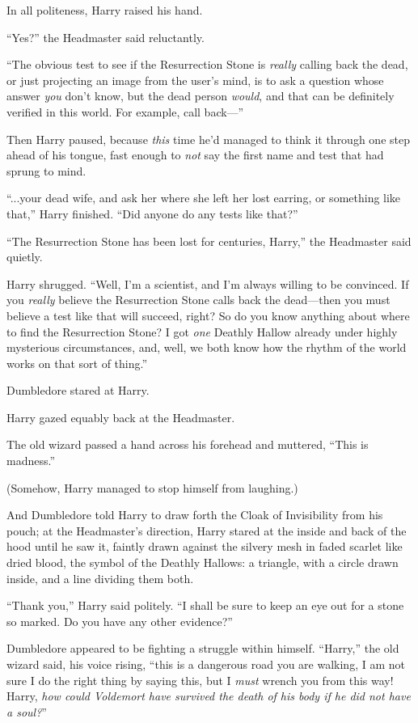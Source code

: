 In all politeness, Harry raised his hand.

“Yes?” the Headmaster said reluctantly.

“The obvious test to see if the Resurrection Stone is \emph{really} calling back the dead, or just projecting an image from the user’s mind, is to ask a question whose answer \emph{you} don’t know, but the dead person \emph{would}, and that can be definitely verified in this world. For example, call back—”

Then Harry paused, because \emph{this} time he’d managed to think it through one step ahead of his tongue, fast enough to \emph{not} say the first name and test that had sprung to mind.

“...your dead wife, and ask her where she left her lost earring, or something like that,” Harry finished. “Did anyone do any tests like that?”

“The Resurrection Stone has been lost for centuries, Harry,” the Headmaster said quietly.

Harry shrugged. “Well, I’m a scientist, and I’m always willing to be convinced. If you \emph{really} believe the Resurrection Stone calls back the dead—then you must believe a test like that will succeed, right? So do you know anything about where to find the Resurrection Stone? I got \emph{one} Deathly Hallow already under highly mysterious circumstances, and, well, we both know how the rhythm of the world works on that sort of thing.”

Dumbledore stared at Harry.

Harry gazed equably back at the Headmaster.

The old wizard passed a hand across his forehead and muttered, “This is madness.”

(Somehow, Harry managed to stop himself from laughing.)

And Dumbledore told Harry to draw forth the Cloak of Invisibility from his pouch; at the Headmaster’s direction, Harry stared at the inside and back of the hood until he saw it, faintly drawn against the silvery mesh in faded scarlet like dried blood, the symbol of the Deathly Hallows: a triangle, with a circle drawn inside, and a line dividing them both.

“Thank you,” Harry said politely. “I shall be sure to keep an eye out for a stone so marked. Do you have any other evidence?”

Dumbledore appeared to be fighting a struggle within himself. “Harry,” the old wizard said, his voice rising, “this is a dangerous road you are walking, I am not sure I do the right thing by saying this, but I \emph{must} wrench you from this way! Harry, \emph{how could Voldemort have survived the death of his body if he did not have a soul?}”

